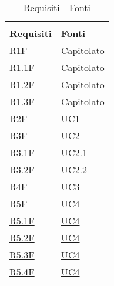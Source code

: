 
\begin{center}
    \centering
    \renewcommand{\arraystretch}{1.8}
    \label{tab:RequisitiFonti}
    \begin{longtable}[!h]{p{50px} p{50px}}
        \rowcolor{white}\caption{Requisiti - Fonti}                                                 \\
        \rowcolor{logo!70} \textbf{Requisiti}      & \textbf{Fonti}                                 \\

        \hyperref[tab:RequisitiFunzionali]{R1F}    & Capitolato                                     \\
        \hyperref[tab:RequisitiFunzionali]{R1.1F}  & Capitolato                                     \\
        \hyperref[tab:RequisitiFunzionali]{R1.2F}  & Capitolato                                     \\
        \hyperref[tab:RequisitiFunzionali]{R1.3F}  & Capitolato                                     \\
        \hyperref[tab:RequisitiFunzionali]{R2F}    & \hyperref[sec:UC1]{UC1}                        \\
        \hyperref[tab:RequisitiFunzionali]{R3F}    & \hyperref[sec:UC2]{UC2}                        \\
        \hyperref[tab:RequisitiFunzionali]{R3.1F}  & \hyperref[sec:UC2.1]{UC2.1}                    \\
        \hyperref[tab:RequisitiFunzionali]{R3.2F}  & \hyperref[sec:UC2.2]{UC2.2}                    \\
        \hyperref[tab:RequisitiFunzionali]{R4F}    & \hyperref[sec:UC3]{UC3}                        \\
        \hyperref[tab:RequisitiFunzionali]{R5F}    & \hyperref[sec:UC4]{UC4}                        \\
        \hyperref[tab:RequisitiFunzionali]{R5.1F}  & \hyperref[sec:UC4]{UC4}                        \\
        \hyperref[tab:RequisitiFunzionali]{R5.2F}  & \hyperref[sec:UC4]{UC4}                        \\
        \hyperref[tab:RequisitiFunzionali]{R5.3F}  & \hyperref[sec:UC4]{UC4}                        \\
        \hyperref[tab:RequisitiFunzionali]{R5.4F}  & \hyperref[sec:UC4]{UC4}                        \\

\end{longtable}
\end{center}
